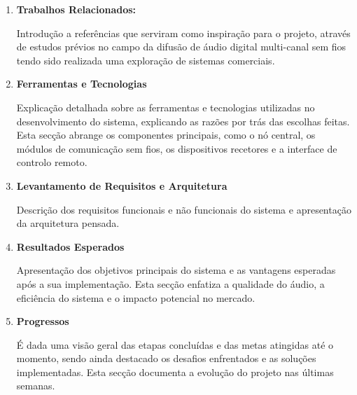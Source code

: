 \documentclass{article}
\begin{document}
\begin{enumerate}
\item \textbf{Trabalhos Relacionados:}
\begin{adjustwidth}{0.1cm}{0.1cm}
Introdução a referências que serviram como inspiração para o projeto, através de estudos prévios no campo da difusão de áudio digital multi-canal sem fios tendo sido realizada uma exploração de sistemas comerciais.
\end{adjustwidth}

    

\vspace{0.2cm}

\item \textbf{Ferramentas e Tecnologias}

\begin{adjustwidth}{0.1cm}{0.1cm}
Explicação detalhada sobre as ferramentas e tecnologias utilizadas no desenvolvimento do sistema, explicando as razões por trás das escolhas feitas. Esta secção abrange os componentes principais, como o nó central, os módulos de comunicação sem fios, os dispositivos recetores e a interface de controlo remoto.

\end{adjustwidth}

\vspace{0.2cm}

\item \textbf{Levantamento de Requisitos e Arquitetura}

\begin{adjustwidth}{0.1cm}{0.1cm}
   Descrição dos requisitos funcionais e não funcionais do sistema e apresentação da arquitetura pensada.
\end{adjustwidth}

\vspace{0.2cm}

\item \textbf{Resultados Esperados}

\begin{adjustwidth}{0.1cm}{0.1cm}
Apresentação dos objetivos principais do sistema e as vantagens esperadas após a sua implementação. Esta secção enfatiza a qualidade do áudio, a eficiência do sistema e o impacto potencial no mercado.
\end{adjustwidth}
\vspace{0.2cm}


\item \textbf{Progressos}

\begin{adjustwidth}{0.1cm}{0.1cm}
   É dada uma visão geral das etapas concluídas e das metas atingidas até o momento, sendo ainda destacado os desafios enfrentados e as soluções implementadas. Esta secção documenta a evolução do projeto nas últimas semanas.
\end{adjustwidth}

\vspace{0.5cm}

\end{enumerate}
\end{document}
